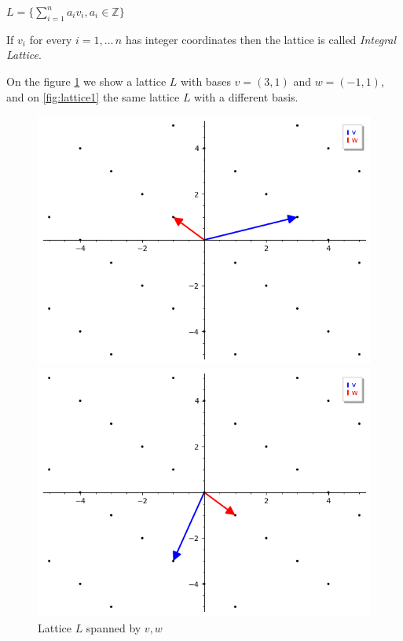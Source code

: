 \documentclass[a4paper,12pt]{report}
\newcommand{\Z}{\mathbb{Z}}
\begin{document}
\begin{center}
    $L = \bigg\{\sum_{i=1}^{n} a_iv_i, a_i \in \Z \bigg\}$
\end{center}

If $v_i$ for every $i = 1,\ldots\,n$ has integer coordinates then the lattice is
called \textit{Integral Lattice}.

On the figure \ref{fig:lattice0} we show a lattice $L$ with bases $v=(3, 1)$ and $w=(-1, 1)$, and on \ref{fig:lattice1} the same lattice $L$ with
a different basis.

\begin{figure}[!tbp]
    \begin{minipage}[b]{0.50\textwidth}
        \includegraphics[width=\textwidth]{./img/lattice_b0.png}
        \caption{Lattice $L$ spanned by $v, w$}
        \label{fig:lattice0}
    \end{minipage}
    \hspace{\fill}
    \hspace{\fill}
    \hspace{\fill}
    \hspace{\fill}
    \hspace{\fill}
    \begin{minipage}[b]{0.50\textwidth}
        \includegraphics[width=\textwidth]{./img/lattice_b1.png}

\end{minipage}
\end{figure}
\end{document}

